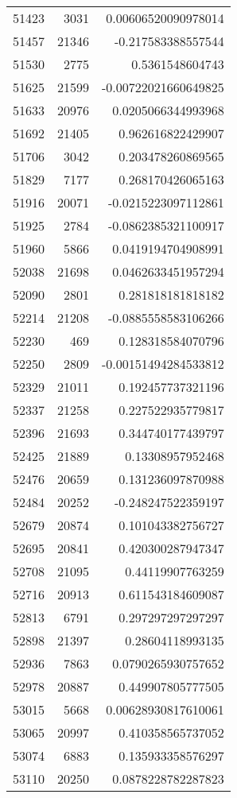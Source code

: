 \begin{tabular}{r | r | r}
51423 & 3031 & 0.00606520090978014 \\
51457 & 21346 & -0.217583388557544 \\
51530 & 2775 & 0.5361548604743 \\
51625 & 21599 & -0.00722021660649825 \\
51633 & 20976 & 0.0205066344993968 \\
51692 & 21405 & 0.962616822429907 \\
51706 & 3042 & 0.203478260869565 \\
51829 & 7177 & 0.268170426065163 \\
51916 & 20071 & -0.0215223097112861 \\
51925 & 2784 & -0.0862385321100917 \\
51960 & 5866 & 0.0419194704908991 \\
52038 & 21698 & 0.0462633451957294 \\
52090 & 2801 & 0.281818181818182 \\
52214 & 21208 & -0.0885558583106266 \\
52230 & 469 & 0.128318584070796 \\
52250 & 2809 & -0.00151494284533812 \\
52329 & 21011 & 0.192457737321196 \\
52337 & 21258 & 0.227522935779817 \\
52396 & 21693 & 0.344740177439797 \\
52425 & 21889 & 0.13308957952468 \\
52476 & 20659 & 0.131236097870988 \\
52484 & 20252 & -0.248247522359197 \\
52679 & 20874 & 0.101043382756727 \\
52695 & 20841 & 0.420300287947347 \\
52708 & 21095 & 0.44119907763259 \\
52716 & 20913 & 0.611543184609087 \\
52813 & 6791 & 0.297297297297297 \\
52898 & 21397 & 0.28604118993135 \\
52936 & 7863 & 0.0790265930757652 \\
52978 & 20887 & 0.449907805777505 \\
53015 & 5668 & 0.00628930817610061 \\
53065 & 20997 & 0.410358565737052 \\
53074 & 6883 & 0.135933358576297 \\
53110 & 20250 & 0.0878228782287823 \\

\end{tabular}
